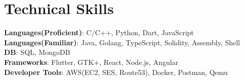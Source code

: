 \documentclass[letterpaper,11pt]{article}
\newcommand{\resumeItem}[1]{
  \item\small{
    {#1 \vspace{-2pt}}
  }
}
\newcommand{\resumeItemListStart}{\begin{itemize}}
\newcommand{\resumeItemListEnd}{\end{itemize}\vspace{-5pt}}
\begin{document}
%
\section{Technical Skills}
 \begin{itemize}[leftmargin=0.15in, label={}]
    \small{\item{
     \textbf{Languages(Proficient)}{: C/C++, Python, Dart, JavaScript } \\
      \textbf{Languages(Familiar)}{: Java, Golang, TypeScript, Solidity, Assembly, Shell } \\
      \textbf{DB}{: SQL, MongoDB} \\
     \textbf{Frameworks}{: Flutter, GTK+, React, Node.js, Angular } \\
     \textbf{Developer Tools}{: AWS(EC2, SES, Route53), Docker, Postman, Qemu } \\
    }}
 \end{itemize}

\end{document}
